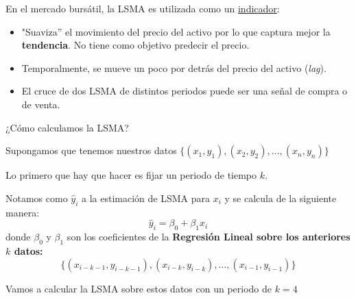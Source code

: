 \documentclass[aspectratio=169, usenames,dvipsnames]{beamer}
\begin{document}
\begin{frame}
    
        En el mercado bursátil, la LSMA es utilizada como un \underline{indicador}:
        
        \begin{itemize}
            \item "Suaviza'' el movimiento del precio del activo por lo que captura mejor la \textbf{tendencia}. \alert{No tiene como objetivo predecir el precio.}
            \item Temporalmente, se mueve un poco por detrás del precio del activo (\textit{lag}).
            \item El cruce de dos LSMA de distintos periodos puede ser una señal de compra o de venta.
        \end{itemize}
\end{frame}

\begin{frame}
    \Large
    ¿Cómo calculamos la LSMA?

    \normalsize
    Supongamos que tenemos nuestros datos $\{(x_1, y_1), (x_2, y_2), \dots, (x_n, y_n)\}$

    \vspace{1em}
    Lo primero que hay que hacer es fijar un periodo de tiempo $k$.

    \vspace{1em}
    Notamos como $\hat{y}_i$ a la estimación de LSMA para $x_i$ y se calcula de la siguiente manera:
    \[\hat{y}_i = \beta_0 + \beta_1 x_i \]
    donde $\beta_0$ y $\beta_1$ son los coeficientes de la \textbf{Regresión Lineal sobre los anteriores $k$ datos:} 
    \[\{(x_{i-k-1}, y_{i-k-1}), (x_{i-k}, y_{i-k}), \dots, (x_{i-1}, y_{i-1})\}\]
\end{frame}

\begin{frame}
    \centering
    Vamos a calcular la LSMA sobre estos datos con un periodo de $k=4$
\end{frame}
\end{document}
